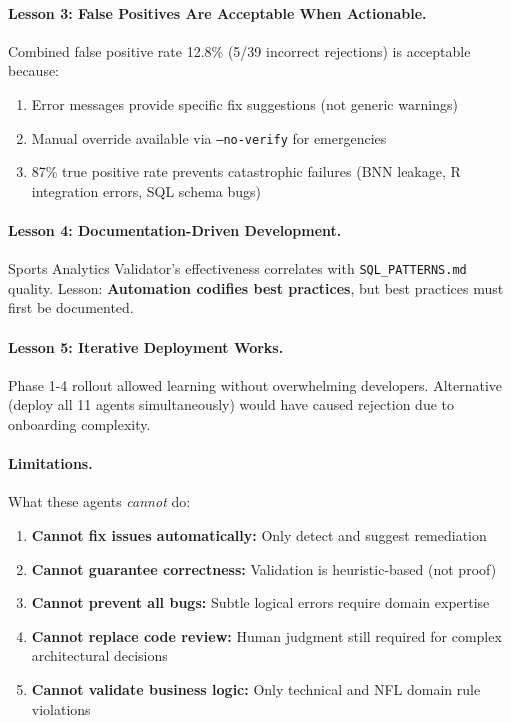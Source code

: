 \paragraph{Lesson 3: False Positives Are Acceptable When Actionable.}
Combined false positive rate 12.8\% (5/39 incorrect rejections) is acceptable because:
\begin{enumerate}[itemsep=2pt,parsep=0pt]
    \item Error messages provide specific fix suggestions (not generic warnings)
    \item Manual override available via \texttt{--no-verify} for emergencies
    \item 87\% true positive rate prevents catastrophic failures (BNN leakage, R integration errors, SQL schema bugs)
\end{enumerate}

\paragraph{Lesson 4: Documentation-Driven Development.}
Sports Analytics Validator's effectiveness correlates with \texttt{SQL\_PATTERNS.md} quality. Lesson: \textbf{Automation codifies best practices}, but best practices must first be documented.

\paragraph{Lesson 5: Iterative Deployment Works.}
Phase 1-4 rollout allowed learning without overwhelming developers. Alternative (deploy all 11 agents simultaneously) would have caused rejection due to onboarding complexity.

\paragraph{Limitations.}

What these agents \textit{cannot} do:

\begin{enumerate}[itemsep=2pt,parsep=0pt]
    \item \textbf{Cannot fix issues automatically:} Only detect and suggest remediation
    \item \textbf{Cannot guarantee correctness:} Validation is heuristic-based (not proof)
    \item \textbf{Cannot prevent all bugs:} Subtle logical errors require domain expertise
    \item \textbf{Cannot replace code review:} Human judgment still required for complex architectural decisions
    \item \textbf{Cannot validate business logic:} Only technical and NFL domain rule violations
\end{enumerate}

